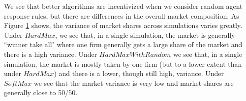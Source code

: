 \documentclass{article}
\theoremstyle{definition}
\begin{document}
\begin{figure}
\label{agent_variances}
\end{figure}

We see that better algorithms are incentivized when we consider random agent response rules, but there are differences in the overall market composition. As Figure \ref{agent_variances} shows, the variance of market shares across simulations varies greatly. Under $HardMax$, we see that, in a single simulation, the market is generally ``winner take all" where one firm generally gets a large share of the market and there is a high variance. Under $HardMaxWithRandom$ we see that, in a single simulation, the market is mostly taken by one firm (but to a lower extent than under $HardMax$) and there is a lower, though still high, variance. Under $SoftMax$ we see that the market variance is very low and market shares are generally close to 50/50.


\end{document}
